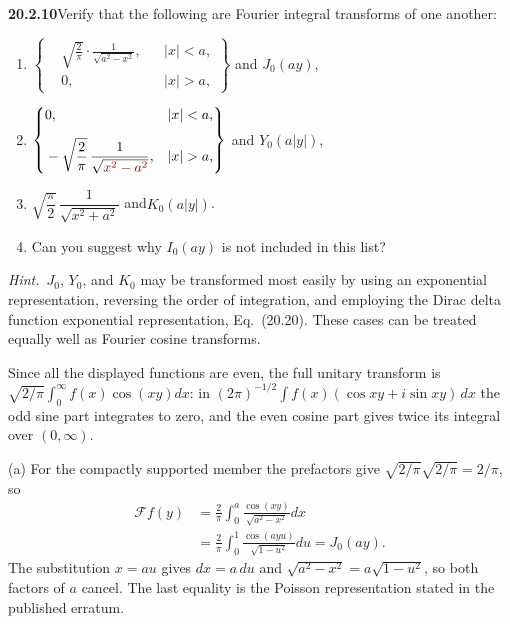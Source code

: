 \par\bigskip
\noindent\textbf{20.2.10}\quad Verify that the following are
Fourier integral transforms of one another:
\begin{enumerate}
\item[(a)] $\left\{\begin{aligned}
&\sqrt{\frac{2}{\pi}}\cdot\frac{1}{\sqrt{a^{2}-x^{2}}},
&&|x| < a,\\[6pt]
&0, &&|x| > a,
\end{aligned}\right\}$ and $J_{0}(ay)$,
\item[(b)] $\left\{\begin{aligned}
&0, &&|x| < a,\\[6pt]
&-\sqrt{\frac{2}{\pi}}\,\frac{1}{\sqrt{\erratum{x^{2}-a^{2}}}},
&&|x| > a,
\end{aligned}\right\}$ and $Y_{0}(a|y|)$,
\item[(c)] $\sqrt{\dfrac{\pi}{2}}\,\dfrac{1}{\sqrt{x^{2}+a^{2}}}$
\quad and\quad $K_{0}(a|y|)$.
\item[(d)] Can you suggest why $I_{0}(ay)$ is not included in
this list?
\end{enumerate}
\par{}
\par\emph{Hint.}~$J_{0}$, $Y_{0}$, and $K_{0}$ may be transformed
most easily by using an exponential representation, reversing the
order of integration, and employing the Dirac delta function
exponential representation, Eq.~(20.20). These cases can be
treated equally well as Fourier cosine transforms.
\par{}
\solution
{} Since all the displayed functions are even,
the full unitary transform is
$\sqrt{2/\pi}\int_0^\infty f(x)\cos(xy)dx$: in
$(2\pi)^{-1/2}\int f(x)(\cos xy+i\sin xy)\,dx$ the odd sine part
integrates to zero, and the even cosine part gives twice its
integral over $(0,\infty)$.

(a) For the compactly supported member the prefactors give
$\sqrt{2/\pi}\sqrt{2/\pi}=2/\pi$, so
\begin{align*}
\mathcal F f(y)&=\frac2\pi\int_0^a
\frac{\cos(xy)}{\sqrt{a^2-x^2}}dx\\
&=\frac2\pi\int_0^1\frac{\cos(ayu)}{\sqrt{1-u^2}}du
=J_0(ay).
\end{align*}
The substitution $x=au$ gives $dx=a\,du$ and
$\sqrt{a^2-x^2}=a\sqrt{1-u^2}$, so both factors of $a$ cancel.
The last equality is the Poisson representation stated in the
published erratum.

